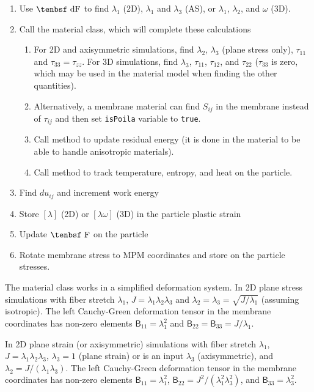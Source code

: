 \documentclass[11pt]{book}
\newcommand{\tens}[1]{\boldsymbol{\mathsf{#1}}}
\def\F{\hbox{\tenbsf F}}
\def\dF{\hbox{\tenbsf dF}}
\begin{document}
\begin{enumerate}
\item Use $\dF$ to find $\lambda_1$ (2D), $\lambda_1$ and $\lambda_3$ (AS), or $\lambda_1$, $\lambda_2$, and $\omega$ (3D).
\item Call the material class, which will complete these calculations
\begin{enumerate}
\item For 2D and axisymmetric simulations, find $\lambda_2$, $\lambda_3$ (plane stress only), $\tau_{11}$ and $\tau_{33} = \tau_{zz}$. For 3D simulations, find $\lambda_3$, $\tau_{11}$, $\tau_{12}$, and $\tau_{22}$ ($\tau_{33}$ is zero, which may be used in the material model when finding the other quantities).
\item Alternatively, a membrane material can find $S_{ij}$ in the membrane instead of $\tau_{ij}$ and then set {\tt isPoila} variable to {\tt true}.
\item Call method to update residual energy (it is done in the material to be able to handle anisotropic materials).
\item Call method to track temperature, entropy, and heat on the particle.
\end{enumerate}
\item Find $du_{ij}$ and increment work energy
\item Store $[\lambda]$ (2D) or $[\lambda\omega]$ (3D) in the particle plastic strain
\item Update $\F$ on the particle
\item Rotate membrane stress to MPM coordinates and store on the particle stresses.
\end{enumerate}

The material class works in a simplified deformation system. In 2D plane stress simulations with fiber stretch $\lambda_1$, $J=\lambda_1\lambda_2\lambda_3$ and $\lambda_2=\lambda_3 = \sqrt{J/\lambda_1}$ (assuming isotropic). The left Cauchy-Green deformation tensor in the membrane coordinates has non-zero elements $\tens{B}_{11} = \lambda_1^2$ and $\tens{B}_{22} = \tens{B}_{33}=J/\lambda_1$.

In 2D plane strain (or axisymmetric) simulations with fiber stretch $\lambda_1$, $J=\lambda_1\lambda_2\lambda_3$, $\lambda_3=1$ (plane strain) or is an input $\lambda_3$ (axisymmetric), and $\lambda_2=J/(\lambda_1\lambda_3)$. The left Cauchy-Green deformation tensor in the membrane coordinates has non-zero elements $\tens{B}_{11} = \lambda_1^2$, $\tens{B}_{22} = J^2/(\lambda_1^2\lambda_3^2)$, and $\tens{B}_{33}=\lambda_3^2$.
\end{document}
